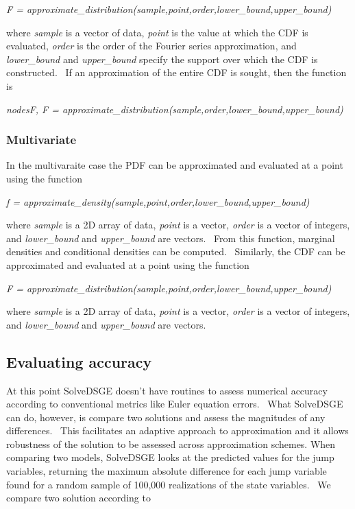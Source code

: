\documentclass[notitlepage,11pt]{article}
\begin{document}
\bigskip

\textit{F =
approximate\_distribution(sample,point,order,lower\_bound,upper\_bound)}

\bigskip

where \textit{sample} is a vector of data, \textit{point} is the value at
which the CDF is evaluated, \textit{order} is the order of the Fourier
series approximation, and \textit{lower\_bound} and \textit{upper\_bound}
specify the support over which the CDF is constructed. \ If an approximation
of the entire CDF is sought, then the function is

\bigskip

\textit{nodesF, F =
approximate\_distribution(sample,order,lower\_bound,upper\_bound)}

\bigskip

\subsubsection{Multivariate}

In the multivaraite case the PDF can be approximated and evaluated at a
point using the function

\bigskip

\textit{f =
approximate\_density(sample,point,order,lower\_bound,upper\_bound)}

\bigskip

where \textit{sample} is a 2D array of data, \textit{point} is a vector, 
\textit{order} is a vector of integers, and \textit{lower\_bound} and 
\textit{upper\_bound} are vectors. \ From this function, marginal densities
and conditional densities can be computed. \ Similarly, the CDF can be
approximated and evaluated at a point using the function

\bigskip 

\textit{F =
approximate\_distribution(sample,point,order,lower\_bound,upper\_bound)}

\bigskip

where \textit{sample} is a 2D array of data, \textit{point} is a vector, 
\textit{order} is a vector of integers, and \textit{lower\_bound} and 
\textit{upper\_bound} are vectors.

\subsection{Evaluating accuracy}

At this point SolveDSGE doesn't have routines to assess numerical accuracy
according to conventional metrics like Euler equation errors. \ What
SolveDSGE can do, however, is compare two solutions and assess the
magnitudes of any differences. \ This facilitates an adaptive approach to
approximation and it allows robustness of the solution to be assessed across
approximation schemes. When comparing two models, SolveDSGE looks at the
predicted values for the jump variables, returning the maximum absolute
difference for each jump variable found for a random sample of 100,000
realizations of the state variables. \ We compare two solution according to
\end{document}
